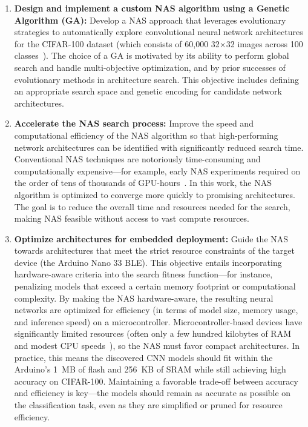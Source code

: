 \begin{enumerate}
    \item \textbf{Design and implement a custom NAS algorithm using a Genetic Algorithm (GA):} Develop a NAS approach that leverages evolutionary strategies to automatically explore convolutional neural network architectures for the CIFAR-100 dataset (which consists of 60,000 32$\times$32 images across 100 classes~\cite{cifar}). The choice of a GA is motivated by its ability to perform global search and handle multi-objective optimization, and by prior successes of evolutionary methods in architecture search. This objective includes defining an appropriate search space and genetic encoding for candidate network architectures.

    \item \textbf{Accelerate the NAS search process:} Improve the speed and computational efficiency of the NAS algorithm so that high-performing network architectures can be identified with significantly reduced search time. Conventional NAS techniques are notoriously time-consuming and computationally expensive---for example, early NAS experiments required on the order of tens of thousands of GPU-hours~\cite{pham2018efficient}. In this work, the NAS algorithm is optimized to converge more quickly to promising architectures. The goal is to reduce the overall time and resources needed for the search, making NAS feasible without access to vast compute resources.

    \item \textbf{Optimize architectures for embedded deployment:} Guide the NAS towards architectures that meet the strict resource constraints of the target device (the Arduino Nano 33 BLE). This objective entails incorporating hardware-aware criteria into the search fitness function---for instance, penalizing models that exceed a certain memory footprint or computational complexity. By making the NAS hardware-aware, the resulting neural networks are optimized for efficiency (in terms of model size, memory usage, and inference speed) on a microcontroller. Microcontroller-based devices have significantly limited resources (often only a few hundred kilobytes of RAM and modest CPU speeds~\cite{lin2020mcunet}), so the NAS must favor compact architectures. In practice, this means the discovered CNN models should fit within the Arduino’s 1~MB of flash and 256~KB of SRAM while still achieving high accuracy on CIFAR-100. Maintaining a favorable trade-off between accuracy and efficiency is key—the models should remain as accurate as possible on the classification task, even as they are simplified or pruned for resource efficiency.


\end{enumerate}
